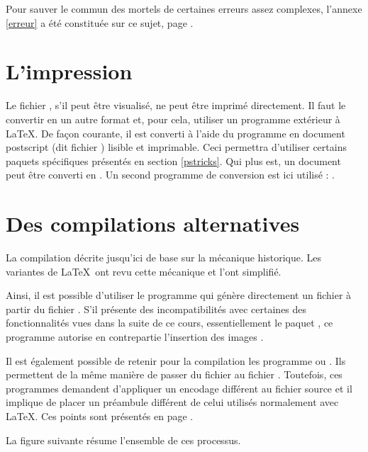 Pour sauver le commun des mortels de certaines erreurs assez complexes, l'annexe \ref{erreur} a été constituée sur ce sujet, page \pageref{erreur}.


\section{L'impression} 

Le fichier , s'il peut être visualisé, ne peut être imprimé directement. Il faut le convertir en un autre format et, pour cela, utiliser un programme extérieur à \LaTeX. De façon courante, il est converti à l'aide du programme  en document postscript (dit fichier ) lisible et imprimable. Ceci permettra d'utiliser certains paquets spécifiques présentés en section \ref{pstricks}. Qui plus est, un document  peut être  converti en . Un second programme de conversion est ici utilisé : .

\section{Des compilations alternatives}\label{compilations}

La compilation décrite jusqu'ici de base sur la mécanique historique. Les variantes de \LaTeX\ ont revu cette mécanique et l'ont simplifié.

Ainsi, il est possible d'utiliser le programme  qui génère directement un fichier  à partir du fichier . S'il présente des incompatibilités avec certaines des fonctionnalités vues dans la suite de ce cours, essentiellement le paquet , ce programme autorise en contrepartie l'insertion des images .

Il est également possible de retenir pour la compilation les programme  ou . Ils permettent de la même manière de passer du fichier  au fichier . Toutefois, ces programmes demandent d'appliquer un encodage différent au fichier source et il implique de placer un préambule différent de celui utilisés normalement avec \LaTeX. Ces points sont présentés en page \pageref{xelatex}.

La figure suivante résume l'ensemble de ces processus.

